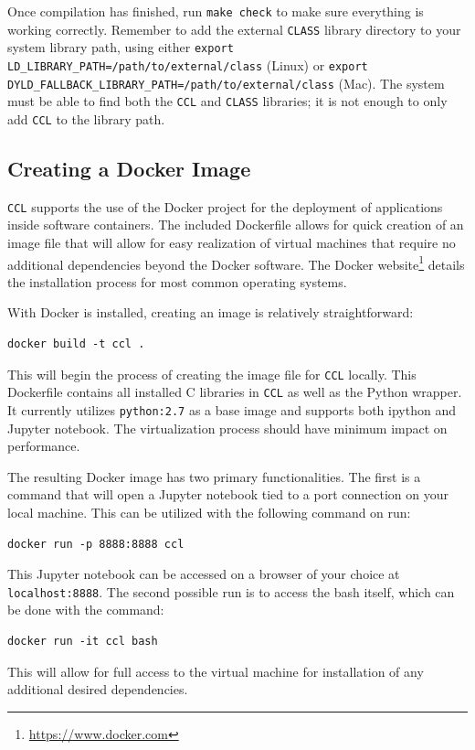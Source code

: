 \documentclass[\docopts]{\docclass}
\begin{document}
Once compilation has finished, run {\tt make check} to make sure everything is working correctly. Remember to add the external {\tt CLASS} library directory to your system library path, using either {\tt export LD\_LIBRARY\_PATH=/path/to/external/class} (Linux) or {\tt export DYLD\_FALLBACK\_LIBRARY\_PATH=/path/to/external/class} (Mac). The system must be able to find both the {\tt CCL} and {\tt CLASS} libraries; it is not enough to only add {\tt CCL} to the library path.

\subsection{Creating a Docker Image}
{\tt CCL} supports the use of the Docker project for the deployment of applications inside software containers. The included Dockerfile allows for quick creation of an image file that will allow for easy realization of virtual machines that require no additional dependencies beyond the Docker software. The Docker website\footnote{\url{https://www.docker.com}} details the installation process for most common operating systems.

With Docker is installed, creating an image is relatively straightforward:
\begin{verbatim}
docker build -t ccl .
\end{verbatim}
This will begin the process of creating the image file for {\tt CCL} locally. This Dockerfile contains all installed C libraries in {\tt CCL} as well as the Python wrapper. It currently utilizes {\tt python:2.7} as a base image and supports both ipython and Jupyter notebook. The virtualization process should have minimum impact on performance.

The resulting Docker image has two primary functionalities. The first is a command that will open a Jupyter notebook tied to a port connection on your local machine. This can be utilized with the following command on run:
\begin{verbatim}
docker run -p 8888:8888 ccl
\end{verbatim}
This Jupyter notebook can be accessed on a browser of your choice at {\tt localhost:8888}. The second possible run is to access the bash itself, which can be done with the command:
\begin{verbatim}
docker run -it ccl bash
\end{verbatim}
This will allow for full access to the virtual machine for installation of any additional desired dependencies.
\end{document}
